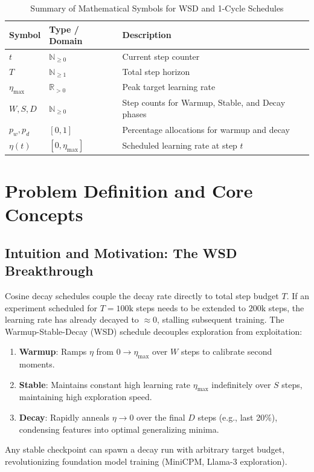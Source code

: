 \documentclass[11pt,a4paper]{article}
\theoremstyle{definition}
\begin{document}
\begin{table}[h]
\centering
\caption{Summary of Mathematical Symbols for WSD and 1-Cycle Schedules}
\begin{tabular}{lll}
\toprule
\textbf{Symbol} & \textbf{Type / Domain} & \textbf{Description} \\
\midrule
$t$ & $\mathbb{N}_{\ge 0}$ & Current step counter \\
$T$ & $\mathbb{N}_{\ge 1}$ & Total step horizon \\
$\eta_{\max}$ & $\mathbb{R}_{> 0}$ & Peak target learning rate \\
$W, S, D$ & $\mathbb{N}_{\ge 0}$ & Step counts for Warmup, Stable, and Decay phases \\
$p_w, p_d$ & $[0, 1]$ & Percentage allocations for warmup and decay \\
$\eta(t)$ & $[0, \eta_{\max}]$ & Scheduled learning rate at step $t$ \\
\bottomrule
\end{tabular}
\end{table}

\section{Problem Definition and Core Concepts}

\subsection{Intuition and Motivation: The WSD Breakthrough}
Cosine decay schedules couple the decay rate directly to total step budget $T$. If an experiment scheduled for $T=100\text{k}$ steps needs to be extended to $200\text{k}$ steps, the learning rate has already decayed to $\approx 0$, stalling subsequent training. The Warmup-Stable-Decay (WSD) schedule decouples exploration from exploitation:
\begin{enumerate}
    \item \textbf{Warmup}: Ramps $\eta$ from $0 \to \eta_{\max}$ over $W$ steps to calibrate second moments.
    \item \textbf{Stable}: Maintains constant high learning rate $\eta_{\max}$ indefinitely over $S$ steps, maintaining high exploration speed.
    \item \textbf{Decay}: Rapidly anneals $\eta \to 0$ over the final $D$ steps (e.g., last 20\%), condensing features into optimal generalizing minima.
\end{enumerate}
Any stable checkpoint can spawn a decay run with arbitrary target budget, revolutionizing foundation model training (MiniCPM, Llama-3 exploration).
\end{document}
